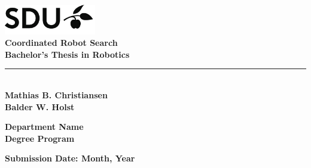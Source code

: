 \begin{titlepage}

    \includegraphics[width=0.3\textwidth]{figures/sdu_logo.png} \\[1cm]

    {\Huge \textbf{Coordinated Robot Search}} \\[0.5cm]
    {\Large \textbf{Bachelor's Thesis in Robotics}} \\[3mm]
    \noindent\rule{\textwidth}{1pt} \\[15mm]
    {\Large \textbf{Mathias B. Christiansen}} \\
    {\Large \textbf{Balder W. Holst}}

    \vfill


    {\large
        \textbf{Department Name} \\
        \textbf{Degree Program} \\[2cm]
    }

    {\large
        \textbf{Submission Date: Month, Year}
    }

\end{titlepage}
